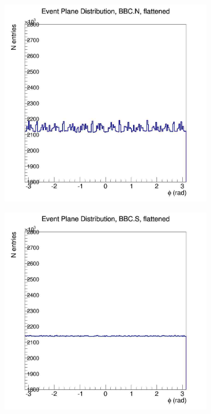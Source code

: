 \begin{figure}[htbp!]
  \centering
    \begin{subfigure}[p]{0.4\textwidth}
    \includegraphics[width=1\textwidth]{EPflattening/flatbbcn.jpg}
    \end{subfigure}
    \begin{subfigure}[p]{0.4\textwidth}
    \includegraphics[width=1\textwidth]{EPflattening/flatbbcs.jpg}

\end{subfigure}
\end{figure}
